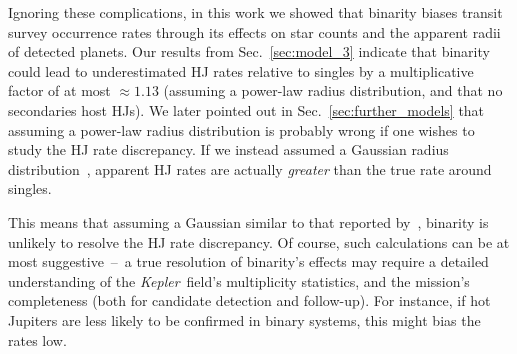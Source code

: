 \documentclass[12pt,modern]{aastex61}
\begin{document}
Ignoring these complications, in this work we showed that
binarity biases transit survey occurrence rates through its effects on 
star counts and the apparent radii of detected planets.
Our results from Sec.~\ref{sec:model_3} indicate that binarity 
could lead to underestimated HJ rates relative to singles by a multiplicative 
factor of at most $\approx 1.13$ (assuming a power-law radius distribution, 
and that no secondaries host HJs).
We later pointed out in Sec.~\ref{sec:further_models} that assuming a 
power-law radius distribution is probably wrong if one wishes to study the HJ 
rate discrepancy. If we instead assumed a 
Gaussian radius distribution~\citep[following][]{petigura_CKS_2017}, apparent 
HJ rates are actually {\it greater} 
than the true rate around singles.

This means that assuming a Gaussian similar to that reported 
by~\citet{petigura_CKS_2017}, binarity is unlikely to resolve the HJ rate 
discrepancy.
Of course, such calculations can be at most suggestive~--~a true resolution 
of binarity's effects may require a detailed understanding of the 
{\it Kepler}\ field's multiplicity statistics, and the mission's completeness 
(both for candidate detection and follow-up).
For instance, if hot Jupiters are less likely to be confirmed in binary 
systems, this might bias the rates low.
\end{document}
